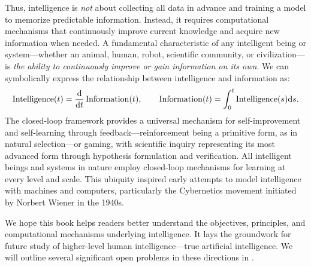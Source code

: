 \documentclass[../../book-main.tex]{subfiles}
\begin{document}
Thus, intelligence is \textit{not} about collecting all data in advance and training a model to memorize predictable information. Instead, it requires computational mechanisms that continuously improve current knowledge and acquire new information when needed. A fundamental characteristic of any intelligent being or system---whether an animal, human, robot, scientific community, or civilization---is \textit{the ability to continuously improve or gain information on its own}. We can symbolically express the relationship between intelligence and information as:
\begin{equation}
    \operatorname{Intelligence}(t) = \odv*{\operatorname{Information}}{t}(t), \qquad 
    \operatorname{Information}(t)  = \int_{0}^{t} \operatorname{Intelligence}(s) \odif{s}.
\end{equation}
The closed-loop framework provides a universal mechanism for self-improvement and self-learning through feedback---reinforcement being a primitive form, as in natural selection---or gaming, with scientific inquiry representing its most advanced form through hypothesis formulation and verification. All intelligent beings and systems in nature employ closed-loop mechanisms for learning at every level and scale. This ubiquity inspired early attempts to model intelligence with machines and computers, particularly the Cybernetics movement initiated by Norbert Wiener in the 1940s.

We hope this book helps readers better understand the objectives, principles, and computational mechanisms underlying intelligence. It lays the groundwork for future study of higher-level human intelligence---true artificial intelligence. We will outline several significant open problems in these directions in .
\end{document}
